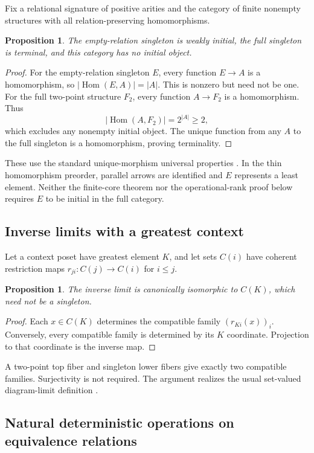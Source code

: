 \documentclass[11pt,letterpaper]{article}
\newtheorem{proposition}[theorem]{Proposition}
\begin{document}
Fix a relational signature of positive arities and the category of finite
nonempty structures with all relation-preserving homomorphisms.

\begin{proposition}
The empty-relation singleton is weakly initial, the full singleton is terminal,
and this category has no initial object.
\end{proposition}
\begin{proof}
For the empty-relation singleton \(E\), every function \(E\to A\) is a
homomorphism, so
\(|\operatorname{Hom}(E,A)|=|A|\). This is nonzero but need not be one.
For the full two-point structure \(F_2\), every function \(A\to F_2\) is a
homomorphism. Thus
\[
 |\operatorname{Hom}(A,F_2)|=2^{|A|}\ge2,
\]
which excludes any nonempty initial object.
The unique function from any \(A\) to the full singleton is a homomorphism,
proving terminality.
\end{proof}

These use the standard unique-morphism universal properties
\cite{stacksinitial}. In the thin homomorphism preorder, parallel arrows
are identified and \(E\) represents a least element. Neither the finite-core
theorem nor the operational-rank proof below requires \(E\) to be initial
in the full category.

\subsection{Inverse limits with a greatest context}

Let a context poset have greatest element \(K\), and let sets \(C(i)\)
have coherent restriction maps \(r_{ji}:C(j)\to C(i)\) for \(i\le j\).

\begin{proposition}
The inverse limit is canonically isomorphic to \(C(K)\), which need not
be a singleton.
\end{proposition}
\begin{proof}
Each \(x\in C(K)\) determines the compatible family
\((r_{Ki}(x))_i\). Conversely, every compatible family is determined by its
\(K\) coordinate. Projection to that coordinate is the inverse map.
\end{proof}

A two-point top fiber and singleton lower fibers give exactly two compatible
families. Surjectivity is not required. The argument realizes the usual
set-valued diagram-limit definition \cite{stackslimit}.

\subsection{Natural deterministic operations on equivalence relations}
\end{document}
